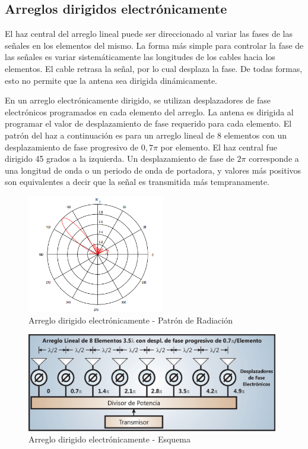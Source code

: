 \subsection{Arreglos dirigidos electrónicamente}

El haz central del arreglo lineal puede ser direccionado al variar las fases de las señales en los elementos del mismo. La forma más simple para controlar la fase de las señales es variar sistemáticamente las longitudes de los cables hacia los elementos. El cable retrasa la señal, por lo cual desplaza la fase. De todas formas, esto no permite que la antena sea dirigida dinámicamente.

En un arreglo electrónicamente dirigido, se utilizan desplazadores de fase electrónicos programados en cada elemento del arreglo. La antena es dirigida al programar el valor de desplazamiento de fase requerido para cada elemento. El patrón del haz a continuación es para un arreglo lineal de 8 elementos con un desplazamiento de fase progresivo de $0,7 \pi$ por elemento. El haz central fue dirigido 45 grados a la izquierda. Un desplazamiento de fase de $2 \pi$ corresponde a una longitud de onda o un periodo de onda de portadora, y valores más positivos son equivalentes a decir que la señal es transmitida más tempranamente.

\begin{figure}[htb!]
        \centering
        \includegraphics[width=6cm]{./figures/C02-steered_array}
        \caption{Arreglo dirigido electrónicamente - Patrón de Radiación}
        \label{fig:steered_array}
\end{figure}

\begin{figure}[htb!]
        \centering
        \includegraphics[width=11cm]{./figures/C02-steered_array_2}
        \caption{Arreglo dirigido electrónicamente - Esquema}
        \label{fig:steered_array2}
\end{figure}

